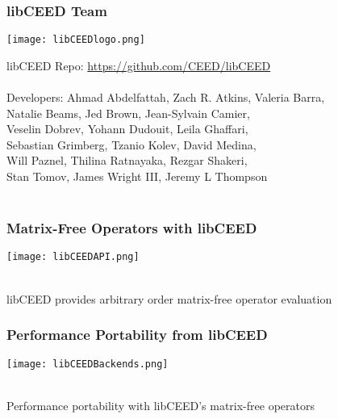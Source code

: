 \documentclass{beamer}
\begin{document}
\begin{frame}
\frametitle{libCEED Team}

\begin{center}
\texttt{[image: libCEEDlogo.png]}
\end{center}

{\flushleft

libCEED Repo: \href{https://github.com/CEED/libCEED}{https://github.com/CEED/libCEED}\\

~\\
Developers: Ahmad Abdelfattah, Zach R. Atkins, Valeria Barra,\\
\hspace{19mm} Natalie Beams, Jed Brown, Jean-Sylvain Camier,\\
\hspace{19mm} Veselin Dobrev, Yohann Dudouit, Leila Ghaffari,\\
\hspace{19mm} Sebastian Grimberg, Tzanio Kolev, David Medina,\\
\hspace{19mm} Will Paznel, Thilina Ratnayaka, Rezgar Shakeri,\\
\hspace{19mm} Stan Tomov, James Wright III, Jeremy L Thompson\\

~\\

}

\end{frame}


\begin{frame}
\begin{center}
\frametitle{Matrix-Free Operators with libCEED}

\texttt{[image: libCEEDAPI.png]}

~\\

libCEED provides arbitrary order matrix-free operator evaluation\\

\end{center}
\end{frame}


\begin{frame}
\begin{center}
\frametitle{Performance Portability from libCEED}

\texttt{[image: libCEEDBackends.png]}

~\\

Performance portability with libCEED's matrix-free operators\\

\end{center}
\end{frame}
\end{document}
